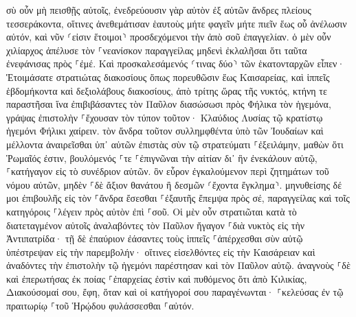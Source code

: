 \documentclass[twoside, 9pt]{extreport}
\begin{document}
σὺ οὖν μὴ πεισθῇς αὐτοῖς, ἐνεδρεύουσιν γὰρ αὐτὸν ἐξ αὐτῶν ἄνδρες πλείους τεσσεράκοντα, οἵτινες ἀνεθεμάτισαν ἑαυτοὺς μήτε φαγεῖν μήτε πιεῖν ἕως οὗ ἀνέλωσιν αὐτόν, καὶ νῦν ⸂εἰσιν ἕτοιμοι⸃ προσδεχόμενοι τὴν ἀπὸ σοῦ ἐπαγγελίαν. 
ὁ μὲν οὖν χιλίαρχος ἀπέλυσε τὸν ⸀νεανίσκον παραγγείλας μηδενὶ ἐκλαλῆσαι ὅτι ταῦτα ἐνεφάνισας πρὸς ⸀ἐμέ. 
Καὶ προσκαλεσάμενός ⸂τινας δύο⸃ τῶν ἑκατονταρχῶν εἶπεν· Ἑτοιμάσατε στρατιώτας διακοσίους ὅπως πορευθῶσιν ἕως Καισαρείας, καὶ ἱππεῖς ἑβδομήκοντα καὶ δεξιολάβους διακοσίους, ἀπὸ τρίτης ὥρας τῆς νυκτός, 
κτήνη τε παραστῆσαι ἵνα ἐπιβιβάσαντες τὸν Παῦλον διασώσωσι πρὸς Φήλικα τὸν ἡγεμόνα, 
γράψας ἐπιστολὴν ⸀ἔχουσαν τὸν τύπον τοῦτον· 
Κλαύδιος Λυσίας τῷ κρατίστῳ ἡγεμόνι Φήλικι χαίρειν. 
τὸν ἄνδρα τοῦτον συλλημφθέντα ὑπὸ τῶν Ἰουδαίων καὶ μέλλοντα ἀναιρεῖσθαι ὑπ᾽ αὐτῶν ἐπιστὰς σὺν τῷ στρατεύματι ⸀ἐξειλάμην, μαθὼν ὅτι Ῥωμαῖός ἐστιν, 
βουλόμενός ⸀τε ⸀ἐπιγνῶναι τὴν αἰτίαν δι᾽ ἣν ἐνεκάλουν αὐτῷ, ⸀κατήγαγον εἰς τὸ συνέδριον αὐτῶν. 
ὃν εὗρον ἐγκαλούμενον περὶ ζητημάτων τοῦ νόμου αὐτῶν, μηδὲν ⸀δὲ ἄξιον θανάτου ἢ δεσμῶν ⸂ἔχοντα ἔγκλημα⸃. 
μηνυθείσης δέ μοι ἐπιβουλῆς εἰς τὸν ⸀ἄνδρα ἔσεσθαι ⸀ἐξαυτῆς ἔπεμψα πρὸς σέ, παραγγείλας καὶ τοῖς κατηγόροις ⸀λέγειν πρὸς αὐτὸν ἐπὶ ⸀σοῦ. 
Οἱ μὲν οὖν στρατιῶται κατὰ τὸ διατεταγμένον αὐτοῖς ἀναλαβόντες τὸν Παῦλον ἤγαγον ⸀διὰ νυκτὸς εἰς τὴν Ἀντιπατρίδα· 
τῇ δὲ ἐπαύριον ἐάσαντες τοὺς ἱππεῖς ⸀ἀπέρχεσθαι σὺν αὐτῷ ὑπέστρεψαν εἰς τὴν παρεμβολήν· 
οἵτινες εἰσελθόντες εἰς τὴν Καισάρειαν καὶ ἀναδόντες τὴν ἐπιστολὴν τῷ ἡγεμόνι παρέστησαν καὶ τὸν Παῦλον αὐτῷ. 
ἀναγνοὺς ⸀δὲ καὶ ἐπερωτήσας ἐκ ποίας ⸀ἐπαρχείας ἐστὶν καὶ πυθόμενος ὅτι ἀπὸ Κιλικίας, 
Διακούσομαί σου, ἔφη, ὅταν καὶ οἱ κατήγοροί σου παραγένωνται· ⸀κελεύσας ἐν τῷ πραιτωρίῳ ⸀τοῦ Ἡρῴδου φυλάσσεσθαι ⸀αὐτόν. 
\end{document}
